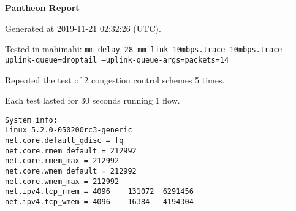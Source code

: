 \documentclass{article}
\begin{document}
\centerline{\textbf{\large{Pantheon Report}}}
\vspace{20pt}

Generated at 2019-11-21 02:32:26 (UTC).

Tested in mahimahi: \texttt{mm-delay 28 mm-link 10mbps.trace 10mbps.trace --uplink-queue=droptail --uplink-queue-args=packets=14}

Repeated the test of 2 congestion control schemes 5 times.

Each test lasted for 30 seconds running 1 flow.

\begin{verbatim}
System info:
Linux 5.2.0-050200rc3-generic
net.core.default_qdisc = fq
net.core.rmem_default = 212992
net.core.rmem_max = 212992
net.core.wmem_default = 212992
net.core.wmem_max = 212992
net.ipv4.tcp_rmem = 4096	131072	6291456
net.ipv4.tcp_wmem = 4096	16384	4194304
\end{verbatim}
\end{document}
